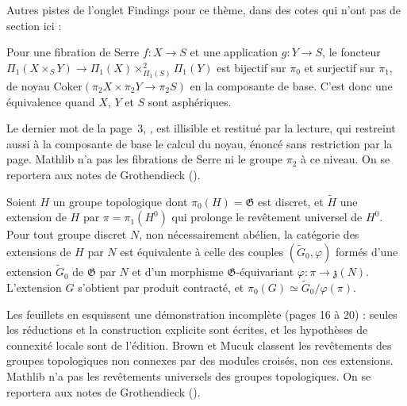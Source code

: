\bigskip
\noindent Autres pistes de l'onglet Findings pour ce thème, dans des cotes qui n'ont pas de section ici :\par

\begin{encadre}
\begin{theoreme*}\nonverifie
Pour une fibration de Serre $f : X \to S$ et une application $g : Y \to S$, le foncteur $\Pi_1(X \times_S Y) \to \Pi_1(X) \times^2_{\Pi_1(S)} \Pi_1(Y)$ est bijectif sur $\pi_0$ et surjectif sur $\pi_1$, de noyau $\mathrm{Coker}(\pi_2X \times \pi_2Y \to \pi_2S)$ en la composante de base. C'est donc une équivalence quand $X$, $Y$ et $S$ sont asphériques.
\end{theoreme*}
\end{encadre}
{\small Le dernier mot de la page~3, , est illisible et restitué par la lecture, qui restreint aussi à la composante de base le calcul du noyau, énoncé sans restriction par la page. Mathlib n'a pas les fibrations de Serre ni le groupe $\pi_2$ à ce niveau. On se reportera aux notes de Grothendieck ().\par}

\begin{encadre}
\begin{theoreme*}\nonverifie
Soient $H$ un groupe topologique dont $\pi_0(H) = \mathfrak G$ est discret, et $\tilde H$ une extension de $H$ par $\pi = \pi_1(H^0)$ qui prolonge le revêtement universel de $H^0$. Pour tout groupe discret $N$, non nécessairement abélien, la catégorie des extensions de $H$ par $N$ est équivalente à celle des couples $(\tilde G_0, \varphi)$ formés d'une extension $\tilde G_0$ de $\mathfrak G$ par $N$ et d'un morphisme $\mathfrak G$-équivariant $\varphi : \pi \to \mathfrak z(N)$. L'extension $G$ s'obtient par produit contracté, et $\pi_0(G) \simeq \tilde G_0/\varphi(\pi)$.
\end{theoreme*}
\end{encadre}
{\small Les feuillets en esquissent une démonstration incomplète (pages 16 à 20) : seules les réductions et la construction explicite sont écrites, et les hypothèses de connexité locale sont de l'édition. Brown et Mucuk classent les revêtements des groupes topologiques non connexes par des modules croisés, non ces extensions. Mathlib n'a pas les revêtements universels des groupes topologiques. On se reportera aux notes de Grothendieck ().\par}

